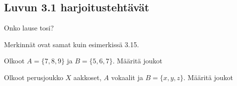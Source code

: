 
\subsection*{Luvun 3.1 harjoitustehtävät}

\setcounter{tehtava}{0}

\begin{tehtava}
     Onko lause tosi? 
    \begin{alakohdat}
    \end{alakohdat}
Merkinnät ovat samat kuin esimerkissä 3.15.
    \begin{vastaus}
    
        \begin{alakohdat}
        \end{alakohdat}
    \end{vastaus}
\end{tehtava}


\begin{tehtava}
 Olkoot $A = \{7, 8, 9\}$ ja $B=\{5, 6, 7\}$. Määritä joukot
    \begin{alakohdat}
    \end{alakohdat}

    \begin{vastaus}
    
        \begin{alakohdat}
        \end{alakohdat}
    \end{vastaus}
\end{tehtava}

\begin{tehtava}
     Olkoot perusjoukko $X$ aakkoset, $A$ vokaalit ja $B=\{x, y, z\}$.
Määritä joukot
    \begin{alakohdat}
    \end{alakohdat}

    \begin{vastaus}
    
        \begin{alakohdat}
            \alakohta{$\emptyset$}
        \end{alakohdat}
    \end{vastaus}
\end{tehtava}

